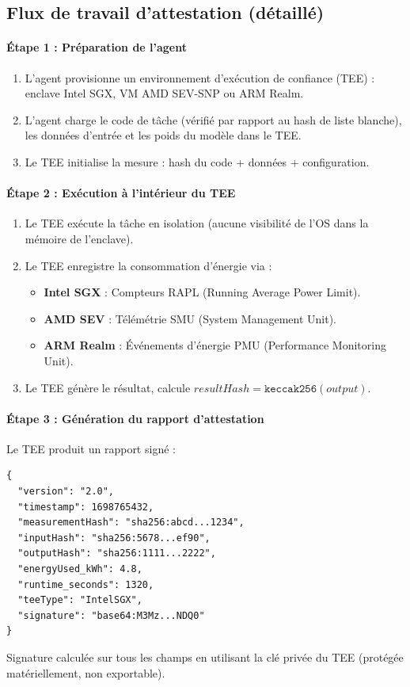 \documentclass[11pt]{article}
\begin{document}
\subsection{Flux de travail d'attestation (détaillé)}
\label{sec:attestation-workflow}
\paragraph{Étape 1 : Préparation de l'agent}
\begin{enumerate}[noitemsep]
  \item L'agent provisionne un environnement d'exécution de confiance (TEE) : enclave Intel SGX, VM AMD SEV-SNP ou ARM Realm.
  \item L'agent charge le code de tâche (vérifié par rapport au hash de liste blanche), les données d'entrée et les poids du modèle dans le TEE.
  \item Le TEE initialise la mesure : hash du code + données + configuration.
\end{enumerate}

\paragraph{Étape 2 : Exécution à l'intérieur du TEE}
\begin{enumerate}[noitemsep]
  \item Le TEE exécute la tâche en isolation (aucune visibilité de l'OS dans la mémoire de l'enclave).
  \item Le TEE enregistre la consommation d'énergie via :
    \begin{itemize}[noitemsep]
      \item \textbf{Intel SGX} : Compteurs RAPL (Running Average Power Limit).
      \item \textbf{AMD SEV} : Télémétrie SMU (System Management Unit).
      \item \textbf{ARM Realm} : Événements d'énergie PMU (Performance Monitoring Unit).
    \end{itemize}
  \item Le TEE génère le résultat, calcule $resultHash = \texttt{keccak256}(output)$.
\end{enumerate}

\paragraph{Étape 3 : Génération du rapport d'attestation}
Le TEE produit un rapport signé :
\begin{verbatim}
{
  "version": "2.0",
  "timestamp": 1698765432,
  "measurementHash": "sha256:abcd...1234",
  "inputHash": "sha256:5678...ef90",
  "outputHash": "sha256:1111...2222",
  "energyUsed_kWh": 4.8,
  "runtime_seconds": 1320,
  "teeType": "IntelSGX",
  "signature": "base64:M3Mz...NDQ0"
}
\end{verbatim}
Signature calculée sur tous les champs en utilisant la clé privée du TEE (protégée matériellement, non exportable).
\end{document}

